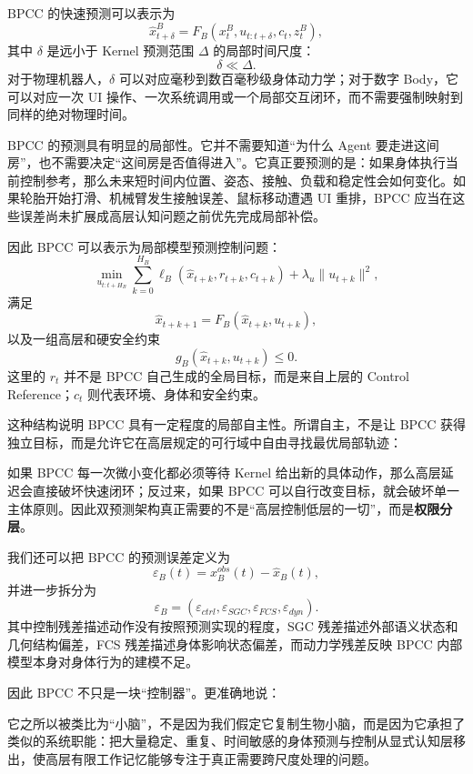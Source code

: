 BPCC 的快速预测可以表示为
\[
\hat x_{t+\delta}^{B}
=
F_B
\left(
x_t^B,
u_{t:t+\delta},
c_t,
z_t^B
\right),
\]
其中 $\delta$ 是远小于 Kernel 预测范围 $\Delta$ 的局部时间尺度：
\[
\boxed{
\delta\ll\Delta.
}
\]
对于物理机器人，$\delta$ 可以对应毫秒到数百毫秒级身体动力学；对于数字 Body，它可以对应一次 UI 操作、一次系统调用或一个局部交互闭环，而不需要强制映射到同样的绝对物理时间。

BPCC 的预测具有明显的局部性。它并不需要知道“为什么 Agent 要走进这间房”，也不需要决定“这间房是否值得进入”。它真正要预测的是：如果身体执行当前控制参考，那么未来短时间内位置、姿态、接触、负载和稳定性会如何变化。如果轮胎开始打滑、机械臂发生接触误差、鼠标移动遭遇 UI 重排，BPCC 应当在这些误差尚未扩展成高层认知问题之前优先完成局部补偿。

因此 BPCC 可以表示为局部模型预测控制问题：
\[
\min_{u_{t:t+H_B}}
\sum_{k=0}^{H_B}
\ell_B
\left(
\hat x_{t+k},
r_{t+k},
c_{t+k}
\right)
+
\lambda_u
\|u_{t+k}\|^2,
\]
满足
\[
\hat x_{t+k+1}
=
F_B
(\hat x_{t+k},u_{t+k}),
\]
以及一组高层和硬安全约束
\[
g_B(\hat x_{t+k},u_{t+k})\leq0.
\]
这里的 $r_t$ 并不是 BPCC 自己生成的全局目标，而是来自上层的 Control Reference；$c_t$ 则代表环境、身体和安全约束。

这种结构说明 BPCC 具有一定程度的局部自主性。所谓自主，不是让 BPCC 获得独立目标，而是允许它在高层规定的可行域中自由寻找最优局部轨迹：
\begin{statementbox}
\centering
{}
\end{statementbox}
如果 BPCC 每一次微小变化都必须等待 Kernel 给出新的具体动作，那么高层延迟会直接破坏快速闭环；反过来，如果 BPCC 可以自行改变目标，就会破坏单一主体原则。因此双预测架构真正需要的不是“高层控制低层的一切”，而是\textbf{权限分层}。

我们还可以把 BPCC 的预测误差定义为
\[
\varepsilon_B(t)
=
x_B^{obs}(t)
-
\hat x_B(t),
\]
并进一步拆分为
\[
\varepsilon_B
=
(
\varepsilon_{ctrl},
\varepsilon_{SGC},
\varepsilon_{FCS},
\varepsilon_{dyn}
).
\]
其中控制残差描述动作没有按照预测实现的程度，SGC 残差描述外部语义状态和几何结构偏差，FCS 残差描述身体影响状态偏差，而动力学残差反映 BPCC 内部模型本身对身体行为的建模不足。

因此 BPCC 不只是一块“控制器”。更准确地说：
\begin{statementbox}
\centering
{}
\end{statementbox}
它之所以被类比为“小脑”，不是因为我们假定它复制生物小脑，而是因为它承担了类似的系统职能：把大量稳定、重复、时间敏感的身体预测与控制从显式认知层移出，使高层有限工作记忆能够专注于真正需要跨尺度处理的问题。

